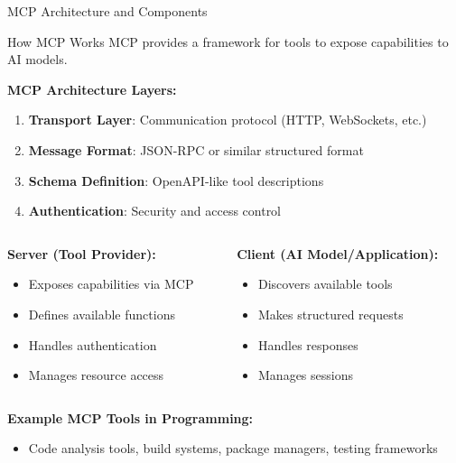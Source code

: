 \documentclass{beamer}
\begin{document}
\begin{frame}[t]{MCP Architecture and Components}
    \begin{block}{How MCP Works}
        MCP provides a framework for tools to expose capabilities to AI models.
    \end{block}
    
    \textbf{MCP Architecture Layers:}
    \begin{enumerate}
        \item \textbf{Transport Layer}: Communication protocol (HTTP, WebSockets, etc.)
        \item \textbf{Message Format}: JSON-RPC or similar structured format
        \item \textbf{Schema Definition}: OpenAPI-like tool descriptions
        \item \textbf{Authentication}: Security and access control
    \end{enumerate}
    
    \begin{columns}[t]
        \begin{column}{0.5\textwidth}
            \textbf{Server (Tool Provider):}
            \begin{itemize}
                \item Exposes capabilities via MCP
                \item Defines available functions
                \item Handles authentication
                \item Manages resource access
            \end{itemize}
        \end{column}
        \begin{column}{0.5\textwidth}
            \textbf{Client (AI Model/Application):}
            \begin{itemize}
                \item Discovers available tools
                \item Makes structured requests
                \item Handles responses
                \item Manages sessions
            \end{itemize}
        \end{column}
    \end{columns}
    
    \textbf{Example MCP Tools in Programming:}
    \begin{itemize}
        \item Code analysis tools, build systems, package managers, testing frameworks
    \end{itemize}
\end{frame}
\end{document}
